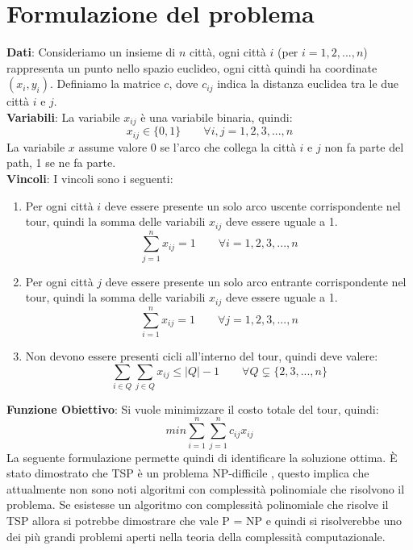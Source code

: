 \documentclass[a4paper,12pt]{report}
\begin{document}
\section{Formulazione del problema}
\textbf{Dati}: Consideriamo un insieme di $n$ città, ogni città $i$ (per $i = 1, 2, ..., n$) rappresenta un punto nello spazio euclideo, ogni città quindi ha coordinate $(x_i, y_i)$. Definiamo la matrice $c$, dove $c_{ij}$ indica la distanza euclidea tra le due città $i$ e $j$.
\\[1\baselineskip]
\textbf{Variabili}: La variabile $x_{ij}$ è una variabile binaria, quindi: $$ x_{ij} \in \{0, 1\} \qquad \forall i, j = 1, 2, 3, ..., n $$ La variabile $x$ assume valore 0 se l'arco che collega la città $i$ e $j$ non fa parte del path, 1 se ne fa parte.
\\[1\baselineskip] \textbf{Vincoli}: I vincoli sono i seguenti:
\begin{enumerate}
        \item Per ogni città $i$ deve essere presente un solo arco uscente corrispondente nel tour, quindi la somma delle variabili $x_{ij}$ deve essere uguale a 1. $$\sum_{j = 1}^{n} x_{ij} = 1 \qquad \forall i = 1, 2, 3, ..., n$$
        \item Per ogni città $j$ deve essere presente un solo arco entrante corrispondente nel tour, quindi la somma delle variabili $x_{ij}$ deve essere uguale a 1. $$\sum_{i = 1}^{n} x_{ij} = 1 \qquad \forall j = 1, 2, 3, ..., n$$
        \item Non devono essere presenti cicli all'interno del tour, quindi deve valere: $$ \sum_{i \in Q}{\sum_{j \in Q}{x_{ij} \le |Q| - 1}} \qquad \forall Q \subsetneq \{2, 3, ..., n\} $$
\end{enumerate}
\textbf{Funzione Obiettivo}: Si vuole minimizzare il costo totale del tour, quindi:
$$min \sum_{i = 1}^{n} \sum_{j = 1}^{n} c_{ij} x_{ij}$$
La seguente formulazione permette quindi di identificare la soluzione ottima.
\newline \null \newline È stato dimostrato che TSP è un problema NP-difficile \cite{TSP NP Completezza}, questo implica che attualmente non sono noti algoritmi con complessità polinomiale che risolvono il problema. Se esistesse un algoritmo con complessità polinomiale che risolve il TSP allora si potrebbe dimostrare che vale P = NP e quindi si risolverebbe uno dei più grandi problemi aperti nella teoria della complessità computazionale. 
\end{document}
